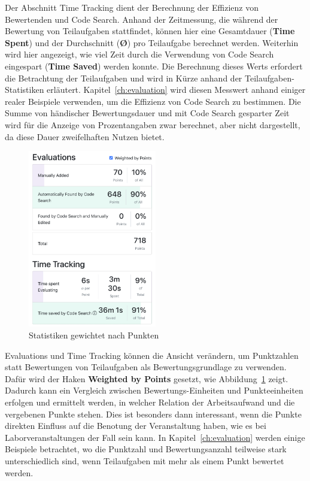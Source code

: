 Der Abschnitt Time Tracking dient der Berechnung der Effizienz von Bewertenden und Code Search.
Anhand der Zeitmessung, die während der Bewertung von Teilaufgaben stattfindet, können hier eine Gesamtdauer (\textbf{Time Spent}) und der Durchschnitt (\textbf{\O}) pro Teilaufgabe berechnet werden.
Weiterhin wird hier angezeigt, wie viel Zeit durch die Verwendung von Code Search eingespart (\textbf{Time Saved}) werden konnte.
Die Berechnung dieses Werts erfordert die Betrachtung der Teilaufgaben und wird in Kürze anhand der Teilaufgaben-Statistiken erläutert.
Kapitel~\ref{ch:evaluation} wird diesen Messwert anhand einiger realer Beispiele verwenden, um die Effizienz von Code Search zu bestimmen.
Die Summe von händischer Bewertungsdauer und mit Code Search gesparter Zeit wird für die Anzeige von Prozentangaben zwar berechnet, aber nicht dargestellt, da diese Dauer zweifelhaften Nutzen bietet.

\begin{figure}
    \centering
    \includegraphics[width=0.5\textwidth]{images/assignment-statistics-by-points}
    \caption{Statistiken gewichtet nach Punkten}
    \label{fig:assignment-statistics-by-points}
\end{figure}

Evaluations und Time Tracking können die Ansicht verändern, um Punktzahlen statt Bewertungen von Teilaufgaben als Bewertungsgrundlage zu verwenden.
Dafür wird der Haken \textbf{Weighted by Points} gesetzt, wie Abbildung~\ref{fig:assignment-statistics-by-points} zeigt.
Dadurch kann ein Vergleich zwischen Bewertungs-Einheiten und Punkteeinheiten erfolgen und ermittelt werden, in welcher Relation der Arbeitsaufwand und die vergebenen Punkte stehen.
Dies ist besonders dann interessant, wenn die Punkte direkten Einfluss auf die Benotung der Veranstaltung haben, wie es bei Laborveranstaltungen der Fall sein kann.
In Kapitel~\ref{ch:evaluation} werden einige Beispiele betrachtet, wo die Punktzahl und Bewertungsanzahl teilweise stark unterschiedlich sind, wenn Teilaufgaben mit mehr als einem Punkt bewertet werden.

